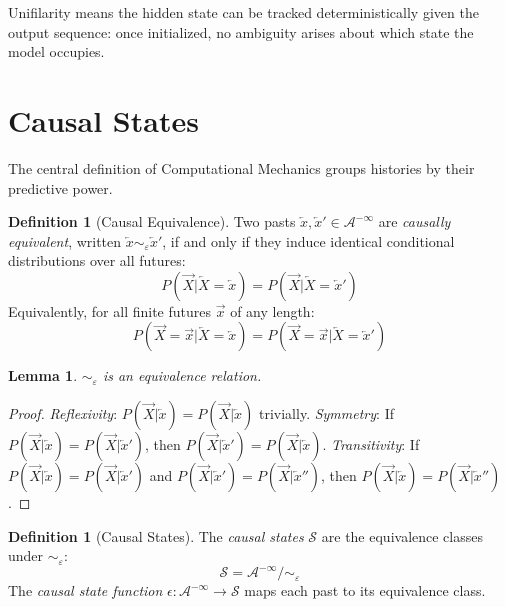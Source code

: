 \documentclass[11pt,twocolumn]{article}
\theoremstyle{plain}
\newtheorem{lemma}[theorem]{Lemma}
\theoremstyle{definition}
\newtheorem{definition}[theorem]{Definition}
\theoremstyle{remark}
\newcommand{\eps}{\varepsilon}
\newcommand{\calS}{\mathcal{S}}
\newcommand{\calA}{\mathcal{A}}
\newcommand{\Past}{\overleftarrow{X}}
\newcommand{\Future}{\overrightarrow{X}}
\newcommand{\past}{\overleftarrow{x}}
\newcommand{\future}{\overrightarrow{x}}
\begin{document}
Unifilarity means the hidden state can be tracked deterministically given the output sequence: once initialized, no ambiguity arises about which state the model occupies.

\section{Causal States}
\label{sec:causal-states}

The central definition of Computational Mechanics groups histories by their predictive power.

\begin{definition}[Causal Equivalence]
\label{def:causal-equiv}
Two pasts $\past, \past' \in \calA^{-\infty}$ are \emph{causally equivalent}, written $\past \sim_\eps \past'$, if and only if they induce identical conditional distributions over all futures:
\begin{equation}
    P(\Future | \Past = \past) = P(\Future | \Past = \past')
\end{equation}
Equivalently, for all finite futures $\future$ of any length:
\begin{equation}
    P(\Future = \future | \Past = \past) = P(\Future = \future | \Past = \past')
\end{equation}
\end{definition}

\begin{lemma}
\label{lem:equiv-relation}
$\sim_\eps$ is an equivalence relation.
\end{lemma}
\begin{proof}
\emph{Reflexivity}: $P(\Future|\past) = P(\Future|\past)$ trivially.
\emph{Symmetry}: If $P(\Future|\past) = P(\Future|\past')$, then $P(\Future|\past') = P(\Future|\past)$.
\emph{Transitivity}: If $P(\Future|\past) = P(\Future|\past')$ and $P(\Future|\past') = P(\Future|\past'')$, then $P(\Future|\past) = P(\Future|\past'')$.
\end{proof}

\begin{definition}[Causal States]
\label{def:causal-states}
The \emph{causal states} $\calS$ are the equivalence classes under $\sim_\eps$:
\begin{equation}
    \calS = \calA^{-\infty} / {\sim_\eps}
\end{equation}
The \emph{causal state function} $\epsilon: \calA^{-\infty} \to \calS$ maps each past to its equivalence class.
\end{definition}
\end{document}
